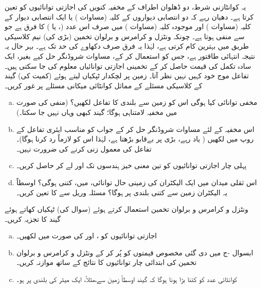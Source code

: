  یہ کوانٹازنی شرط،   دو  ڈھلوان اطراف کے    مخفیہ کنویں کی اجازتی توانائیوں کو  تعین کرتا ہے۔  دھیان رہے کہ   دو انتصابی دیواروں کے  کلیہ (مساوات ) یا  ایک انتصابی دیوار کے  کلیہ (مساوات ) اور موجودہ کلیہ (مساوات )  میں صرف اس عدد (،  یا )  کا فرق ہے جو   سے منفی ہوتا ہے۔ چونکہ ونٹزل و کرامرس و برلوان  تخمین  (بڑی  کی)  نیم کلاسیکی  طریق میں بہترین کام کرتی ہے، لہٰذا یہ فرق صرف دکھاوے کی حد تک ہے۔ بہر حال یہ نتیجہ انتہائی طاقتور ہے،  جس کو استعمال کر کے،  مساوات شروڈنگر  حل کیے بغیر،  ایک سادہ تکمل کی قیمت حاصل کر کے تخمینی اجازتی توانائیاں معلوم کی جا سکتی ہیں۔ تفاعل موج خود کہیں نہیں نظر آتا۔
زمین پر   لچکدار   ٹپکیاں لیتے  ہوئے  (کمیت  کی)  گیند کے کلاسیکی مسئلے کے مماثل کوانٹائی میکانی مسئلے پر غور کریں۔
\begin{enumerate}[a.]
\item
 مخفی توانائی کیا ہوگی اس کو زمین سے بلندی  کا  تفاعل لکھیں؟ (منفی  کی صورت میں مخفیہ لامتناہی ہوگا؛  گیند کبھی وہاں  نہیں جا سکتا۔)
\item
 اس مخفیہ کے لئے مساوات شروڈنگر حل کر کے  جواب کو مناسب ایئری تفاعل کے روپ میں لکھیں ( یاد رہے،  بڑی   پر   بےقابو بڑھتا ہے،  لہٰذا اس کو  لازماً رد کرنا ہوگا)۔ تفاعل  کی معمول زنی کرنے  کی ضرورت نہیں۔
\item
 پہلی چار اجازتی توانائیوں کو تین معنی خیز ہندسوں تک  اور  لے کر حاصل کریں۔
\item
 اس ثقلی میدان میں ایک الیکٹران کی زمینی حال توانائی،   میں،  کتنی ہوگی؟ اوسطاً یہ الیکٹران زمین سے کتنی بلندی پر ہوگا؟  مسئلہ وریل سے  کا  تعین کریں۔
 \end{enumerate}
 ونٹزل و کرامرس و برلوان   تخمین استعمال کرتے ہوئے (سوال   کی)  ٹپکیاں  کھاتے ہوئے گیند کا تجزیہ کریں۔
\begin{enumerate}[a.]
\item
 اجازتی توانائیوں   کو ،   اور  کی صورت میں لکھیں۔
\item
 ابسوال -ج  میں دی گئی مخصوص قیمتوں کو پُر کر کے ونٹزل و کرامرس و برلوان  تخمین کی ابتدائی چار توانائیوں کا   نتائج کے ساتھ موازنہ کریں۔
\item
کوانٹائی عدد  کو  کتنا بڑا ہونا ہوگا کہ گیند اوسطاً زمین سے،مثلاً،  ایک میٹر کی بلندی پر ہو۔
\end{enumerate}
